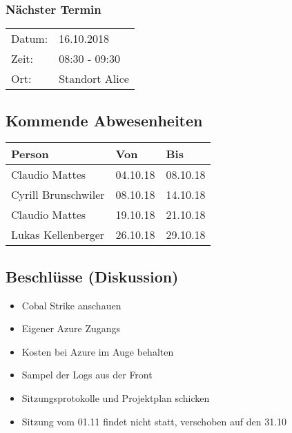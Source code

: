 \subsubsection*{Nächster Termin}

\begin{tabular}{p{4cm} p{12cm}}
    Datum: & 16.10.2018 \\
    Zeit: & 08:30 - 09:30 \\
    Ort: & Standort Alice \\
\end{tabular}

\subsection*{Kommende Abwesenheiten}
\begin{table}[H]
    \centering
    \begin{tabular}{p{6cm} p{5cm} p{5cm}}
        \textbf{Person} & \textbf{Von} & \textbf{Bis} \\ \hline
        Claudio Mattes & 04.10.18 & 08.10.18 \\ \hline
        Cyrill Brunschwiler & 08.10.18 & 14.10.18 \\ \hline
        Claudio Mattes & 19.10.18 & 21.10.18 \\ \hline
        Lukas Kellenberger & 26.10.18 & 29.10.18 \\ \hline
    \end{tabular}
\end{table}

\subsection*{Beschlüsse (Diskussion)}
\begin{itemize}
\item Cobal Strike anschauen
\item Eigener Azure Zugangs
\item Kosten bei Azure im Auge behalten
\item Sampel der Logs aus der Front
\item Sitzungsprotokolle und Projektplan schicken
\item Sitzung vom 01.11 findet nicht statt, verschoben auf den 31.10
\end{itemize}

